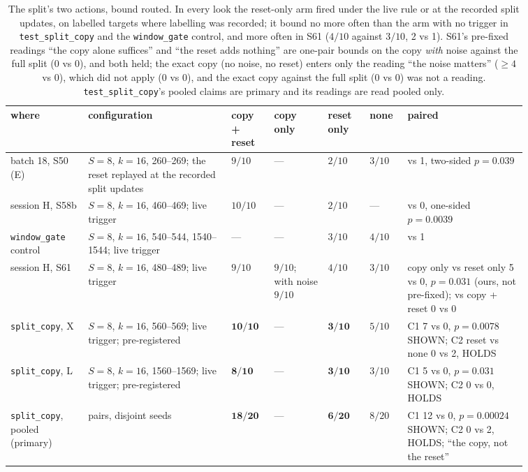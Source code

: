 \documentclass[11pt]{article}
\begin{document}
\begin{table}[H]
\centering
\footnotesize
\setlength{\tabcolsep}{3pt}
\begin{tabular}{@{}>{\raggedright\arraybackslash}p{0.13\linewidth}>{\raggedright\arraybackslash}p{0.24\linewidth}>{\centering\arraybackslash}p{0.07\linewidth}>{\centering\arraybackslash}p{0.09\linewidth}>{\centering\arraybackslash}p{0.07\linewidth}>{\centering\arraybackslash}p{0.06\linewidth}>{\raggedright\arraybackslash}p{0.2\linewidth}@{}}
\toprule
where & configuration & copy + reset & copy only & reset only & none & paired\\
\midrule
batch 18, S50 (E) & $S{=}8$, $k{=}16$, 260--269; the reset replayed at the recorded split updates & $9/10$ & --- & $2/10$ & $3/10$ & 8 vs 1, two-sided $p = 0.039$\\
session H, S58b & $S{=}8$, $k{=}16$, 460--469; live trigger & $10/10$ & --- & $2/10$ & --- & 8 vs 0, one-sided $p = 0.0039$\\
\texttt{window\_gate} control & $S{=}8$, $k{=}16$, 540--544, 1540--1544; live trigger & --- & --- & $3/10$ & $4/10$ & 0 vs 1\\
session H, S61 & $S{=}8$, $k{=}16$, 480--489; live trigger & $9/10$ & $9/10$; with noise $9/10$ & $4/10$ & $3/10$ & copy only vs reset only 5 vs 0, $p = 0.031$ (ours, not pre-fixed); vs copy + reset 0 vs 0\\
\texttt{split\_copy}, X & $S{=}8$, $k{=}16$, 560--569; live trigger; pre-registered & $\mathbf{10/10}$ & --- & $\mathbf{3/10}$ & $5/10$ & C1 7 vs 0, $p = 0.0078$ SHOWN; C2 reset vs none 0 vs 2, HOLDS\\
\texttt{split\_copy}, L & $S{=}8$, $k{=}16$, 1560--1569; live trigger; pre-registered & $\mathbf{8/10}$ & --- & $\mathbf{3/10}$ & $3/10$ & C1 5 vs 0, $p = 0.031$ SHOWN; C2 0 vs 0, HOLDS\\
\texttt{split\_copy}, pooled (primary) & 20 pairs, disjoint seeds & $\mathbf{18/20}$ & --- & $\mathbf{6/20}$ & $8/20$ & C1 12 vs 0, $p = 0.00024$ SHOWN; C2 0 vs 2, HOLDS; ``the copy, not the reset''\\
\bottomrule
\end{tabular}
\caption{The split's two actions, bound routed. In every look the reset-only arm fired under the live rule or at the recorded split updates, on labelled targets where labelling was recorded; it bound no more often than the arm with no trigger in \texttt{test\_split\_copy} and the \texttt{window\_gate} control, and more often in S61 ($4/10$ against $3/10$, 2 vs 1). S61's pre-fixed readings ``the copy alone suffices'' and ``the reset adds nothing'' are one-pair bounds on the copy \emph{with} noise against the full split (0 vs 0), and both held; the exact copy (no noise, no reset) enters only the reading ``the noise matters'' ($\geq 4$ vs 0), which did not apply (0 vs 0), and the exact copy against the full split (0 vs 0) was not a reading. \texttt{test\_split\_copy}'s pooled claims are primary and its readings are read pooled only.}
\label{tab:copy}
\end{table}
\end{document}
